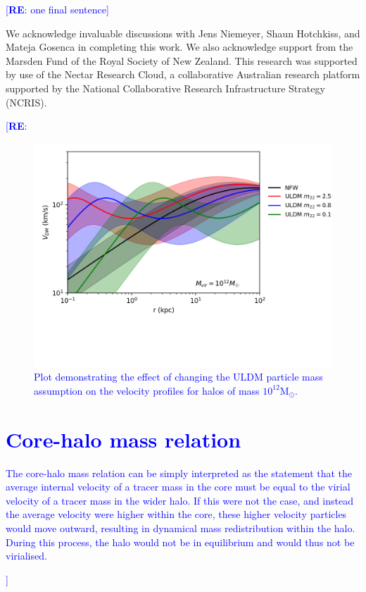 \documentclass{pasa}%
\newcommand{\re}[1]{\textcolor{blue}{[{\bf RE}: #1]}}
\begin{document}
\re{one final sentence}

\begin{acknowledgements}
We acknowledge invaluable discussions with Jens Niemeyer, Shaun Hotchkiss, and Mateja Gosenca in completing this work. We also acknowledge support from the Marsden Fund of the Royal Society of New Zealand. This research was supported by use of the Nectar Research Cloud, a collaborative Australian research platform supported by the National Collaborative Research Infrastructure Strategy (NCRIS).

\end{acknowledgements}

\re{

\begin{appendix}

\begin{figure}[t]
\centering
\includegraphics[scale = 0.8, trim={0cm 2.5cm 1cm 0cm}]{000_comp_10_12.png} 
\caption{Plot demonstrating the effect of changing the ULDM particle mass assumption on the velocity profiles for halos of mass $10^{12}\mathrm{M}_{\odot}$.}\label{fig:vel_5_10_11}
\end{figure}

\section{Core-halo mass relation}\label{app:core-halo}

 The core-halo mass relation can be simply interpreted as the statement that the average internal velocity of a tracer mass in the core must be equal to the virial velocity of a tracer mass in the wider halo. If this were not the case, and instead the average velocity were higher within the core, these higher velocity particles would move outward, resulting in dynamical mass redistribution within the halo. During this process, the halo would not be in equilibrium and would thus not be virialised.


\end{appendix}}
\end{document}
